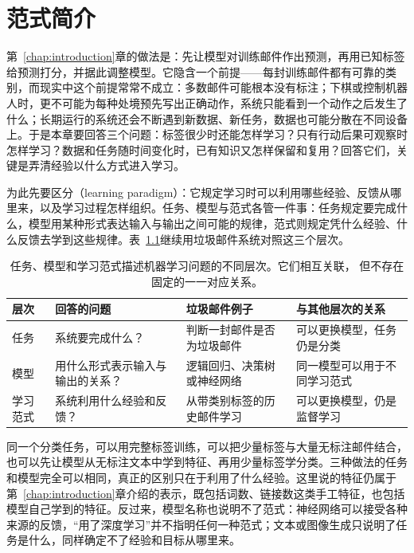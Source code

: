 \chapter{范式简介}
\label{chap:machine-learning-paradigms}

第~\ref{chap:introduction}章的做法是：先让模型对训练邮件作出预测，再用已知标签给预测打分，并据此调整模型。它隐含一个前提——每封训练邮件都有可靠的类别，而现实中这个前提常常不成立：多数邮件可能根本没有标注；下棋或控制机器人时，更不可能为每种处境预先写出正确动作，系统只能看到一个动作之后发生了什么；长期运行的系统还会不断遇到新数据、新任务，数据也可能分散在不同设备上。于是本章要回答三个问题：标签很少时还能怎样学习？只有行动后果可观察时怎样学习？数据和任务随时间变化时，已有知识又怎样保留和复用？回答它们，关键是弄清经验以什么方式进入学习。

为此先要区分（learning paradigm）：它规定学习时可以利用哪些经验、反馈从哪里来，以及学习过程怎样组织。任务、模型与范式各管一件事：任务规定要完成什么，模型用某种形式表达输入与输出之间可能的规律，范式则规定凭什么经验、什么反馈去学到这些规律。表~\ref{tab:task-paradigm-model}继续用垃圾邮件系统对照这三个层次。

\begin{table}[htbp]
  \centering
  \small
  \begin{tabularx}{\linewidth}{@{}lXXX@{}}
    \toprule
    \textbf{层次} & \textbf{回答的问题} & \textbf{垃圾邮件例子} & \textbf{与其他层次的关系} \\
    \midrule
    任务 & 系统要完成什么？ & 判断一封邮件是否为垃圾邮件 & 可以更换模型，任务仍是分类 \\
    模型 & 用什么形式表示输入与输出的关系？ & 逻辑回归、决策树或神经网络 & 同一模型可以用于不同学习范式 \\
    学习范式 & 系统利用什么经验和反馈？ & 从带类别标签的历史邮件学习 & 可以更换模型，仍是监督学习 \\
    \bottomrule
  \end{tabularx}
  \caption{任务、模型和学习范式描述机器学习问题的不同层次。它们相互关联，
  但不存在固定的一一对应关系。}
  \label{tab:task-paradigm-model}
\end{table}

同一个分类任务，可以用完整标签训练，可以把少量标签与大量无标注邮件结合，也可以先让模型从无标注文本中学到特征、再用少量标签学分类。三种做法的任务和模型完全可以相同，真正的区别只在于利用了什么经验。这里说的特征仍属于第~\ref{chap:introduction}章介绍的表示，既包括词数、链接数这类手工特征，也包括模型自己学到的特征。反过来，模型名称也说明不了范式：神经网络可以接受各种来源的反馈，“用了深度学习”并不指明任何一种范式；文本或图像生成只说明了任务是什么，同样确定不了经验和目标从哪里来。

